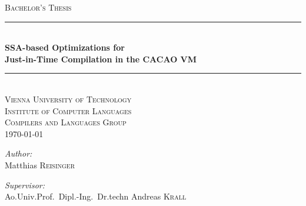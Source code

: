 \begin{titlepage}

\newcommand{\HRule}{\rule{\linewidth}{0.5mm}} %

\center %
 
\vspace*{60pt} 
 

\textsc{\LARGE Bachelor's Thesis}\\[1.5cm]


\HRule \\[0.3cm]
{\LARGE \bfseries SSA-based Optimizations for\\[2pt]Just-in-Time Compilation in the CACAO VM}\\[0.3cm] %
\HRule \\[1.5cm]

\textsc{\Large Vienna University of Technology}\\[0.5cm]
\textsc{\large Institute of Computer Languages\\Compilers and Languages Group}\\[2cm]


{\large \today}


\vfill

\begin{flushleft} \large
\emph{Author:}\\
Matthias \textsc{Reisinger} %
\end{flushleft}

\begin{flushleft} \large
\emph{Supervisor:} \\
Ao.Univ.Prof.\ Dipl.-Ing.\ Dr.techn Andreas \textsc{Krall} %
\end{flushleft}

\end{titlepage}